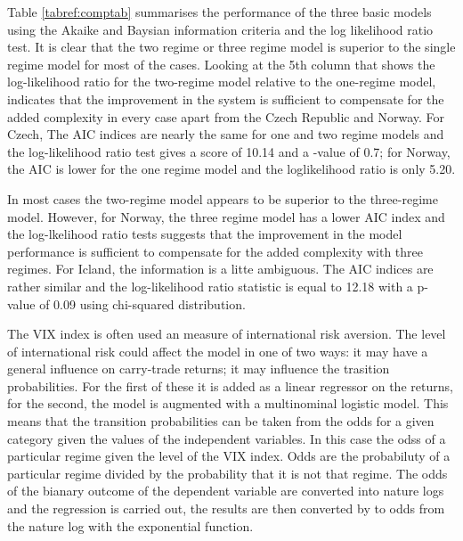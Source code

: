 \documentclass[12pt, a4paper, oneside]{article} %
\begin{document}

Table \ref{tabref:comptab} summarises the performance of the three basic models using the Akaike and Baysian information criteria and the log likelihood ratio test.  It is clear that the two regime or three regime model is superior to the single regime model for most of the cases.  Looking at the 5th column that shows the log-likelihood ratio for the two-regime model relative to the one-regime model, indicates that the improvement in the system is sufficient to compensate for the added complexity in every case apart from the Czech Republic and Norway.  For Czech, The AIC indices are nearly the same for one and two regime models and the log-likelihood ratio test gives a score of 10.14 and a -value of 0.7; for Norway, the AIC is lower for the one regime model and the loglikelihood ratio is only 5.20.  

In most cases the two-regime model appears to be superior to the three-regime model.  However, for Norway, the three regime model has a lower AIC index and the log-lkelihood ratio tests suggests that the improvement in the model performance is sufficient to compensate for the added complexity with three regimes.  For Icland, the information is a litte ambiguous.  The AIC indices are rather similar and the log-likelihood ratio statistic is equal to 12.18 with a p-value of 0.09 using chi-squared distribution. 

The VIX index is often used an measure of international risk aversion. The level of international risk could affect the model in one of two ways:  it may have a general influence on carry-trade returns; it may influence the trasition probabilities. For the first of these it is added as a linear regressor on the returns, for the second, the model is augmented with a multinominal logistic model.  This means that the transition probabilities can be taken from the odds for a given category given the values of the independent variables. In this case the odss of a particular regime given the level of the VIX index. Odds are the probabiluty of a particular regime divided by the probability that it is not that regime. The odds of the bianary outcome of the dependent variable are converted into nature logs and the regression is carried out, the results are then converted by to odds from the nature log with the exponential function. 
\end{document}
